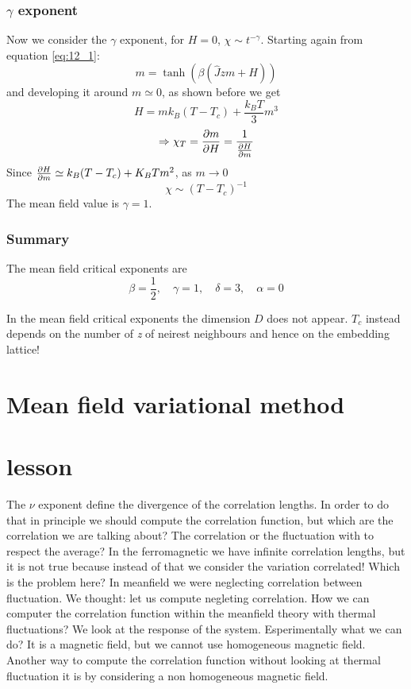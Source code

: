 \documentclass[../main/main.tex]{subfiles}
\begin{document}
\subsubsection{\( \gamma   \) exponent}
Now we consider the \( \gamma   \) exponent, for \( H=0 \), \( \chi \sim t^{-\gamma  } \).   Starting again from equation \eqref{eq:12_1}:
\begin{equation}
  m = \tanh (\beta (\hat{J}zm+H ))
\end{equation}
and developing it around \( m \simeq 0 \), as shown before we get
\begin{equation}
  H = m k_B (T-T_c)+ \frac{k_B T}{3}m^3
\end{equation}
\begin{equation}
  \Rightarrow \chi _T = \pdv{m}{H} = \frac{1}{\pdv{H}{m} }
\end{equation}
Since \( \pdv{H}{m} \simeq k_B (T-T_c) + K_B T m^2 \), as \( m \rightarrow 0 \)
\begin{equation}
  \chi \sim (T-T_c)^{-1}
\end{equation}
The mean field value is \( \gamma =1  \).

\subsubsection{Summary}
The mean field critical exponents are
\begin{equation}
  \beta = \frac{1}{2}, \quad \gamma =1, \quad \delta =3, \quad \alpha =0
\end{equation}
\begin{remark}
In the mean field critical exponents the dimension \( D \) does not appear. \( T_c \) instead depends on the number of \emph{z} of neirest neighbours and hence on the embedding lattice!
\end{remark}

\section{Mean field variational method}



\section{lesson}


The \( \nu  \) exponent define the divergence of the correlation lengths. In order to do that in principle we should compute the correlation function, but which are the correlation we are talking about? The correlation or the fluctuation with to respect the average? In the ferromagnetic we have infinite correlation lengths, but it is not true because instead of that we consider the variation correlated!
Which is the problem here? In meanfield we were neglecting correlation between fluctuation.
We thought: let us compute negleting correlation.
How we can computer the correlation function within the meanfield theory with thermal fluctuations? We look at the response of the system. Esperimentally what we can do? It is a magnetic field, but we cannot use homogeneous magnetic field. Another way to compute the correlation function without looking at thermal fluctuation it is by considering a non homogeneous magnetic field.
\end{document}

